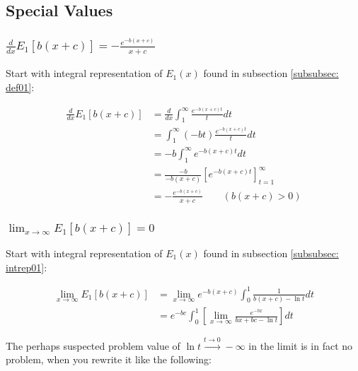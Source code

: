 \documentclass[bibliography=totocnumbered]{scrartcl}
\begin{document}
	\subsection{Special Values}
	
	\subsubsection[A derivative of E1]{$\frac{d}{dx}E_1\left[b\left(x+c\right)\right]=-\frac{e^{-b\left(x+c\right)}}{x+c}$}
	\label{subsubsec: specval_deriv}
	
	Start with integral representation of $E_1\left(x\right)$ found in subsection \ref{subsubsec: def01}:
	
	\begin{align}
		\frac{d}{dx}E_1\left[b\left(x+c\right)\right]&=\frac{d}{dx}\int_{1}^{\infty}\frac{e^{-b\left(x+c\right)t}}{t}dt\\
		&=\int_{1}^{\infty}\left(-bt\right)\frac{e^{-b\left(x+c\right)t}}{t}dt\\
		&=-b\int_{1}^{\infty}e^{-b\left(x+c\right)t}dt\\
		&=\frac{-b}{-b\left(x+c\right)}\left[e^{-b\left(x+c\right)t}\right]^{\infty}_{t=1}\\
		&=-\frac{e^{-b\left(x+c\right)}}{x+c}\qquad\left(b\left(x+c\right)>0\right)
	\end{align}
	
	\subsubsection[A limit of E1 as x approaches infinity]{$\lim_{x\rightarrow\infty}E_1\left[b\left(x+c\right)\right]=0$}
	\label{subsubsec: specval01}
	
	Start with integral representation of $E_1\left(x\right)$ found in subsection \ref{subsubsec: intrep01}:
	
	\begin{align}
		\lim_{x\rightarrow\infty}E_1\left[b\left(x+c\right)\right]&=\lim_{x\rightarrow\infty}e^{-b\left(x+c\right)}\int_{0}^{1}\frac{1}{b\left(x+c\right)-\ln{t}}dt\\
		&=e^{-bc}\int_{0}^{1}\left[\lim_{x\rightarrow\infty}\frac{e^{-bx}}{bx+bc-\ln{t}}\right]dt
	\end{align}
	
	The perhaps suspected problem value of $\ln{t}\overset{t\rightarrow0}{\longrightarrow}-\infty$ in the limit is in fact no problem, when you rewrite it like the following:
	
\end{document}
